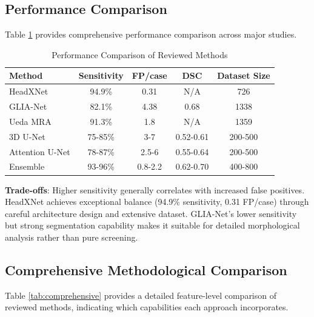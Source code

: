 \documentclass[conference]{IEEEtran}
\begin{document}
\subsection{Performance Comparison}

Table \ref{tab:performance} provides comprehensive performance comparison across major studies.

\begin{table}[htbp]
\caption{Performance Comparison of Reviewed Methods}
\begin{center}
\begin{tabular}{|l|c|c|c|c|}
\hline
\textbf{Method} & \textbf{Sensitivity} & \textbf{FP/case} & \textbf{DSC} & \textbf{Dataset Size} \\
\hline
HeadXNet & 94.9\% & 0.31 & N/A & 726 \\
\hline
GLIA-Net & 82.1\% & 4.38 & 0.68 & 1338 \\
\hline
Ueda MRA & 91.3\% & 1.8 & N/A & 1359 \\
\hline
3D U-Net & 75-85\% & 3-7 & 0.52-0.61 & 200-500 \\
\hline
Attention U-Net & 78-87\% & 2.5-6 & 0.55-0.64 & 200-500 \\
\hline
Ensemble & 93-96\% & 0.8-2.2 & 0.62-0.70 & 400-800 \\
\hline
\end{tabular}
\label{tab:performance}
\end{center}
\end{table}

\textbf{Trade-offs}: Higher sensitivity generally correlates with increased false positives. HeadXNet achieves exceptional balance (94.9\% sensitivity, 0.31 FP/case) through careful architecture design and extensive dataset. GLIA-Net's lower sensitivity but strong segmentation capability makes it suitable for detailed morphological analysis rather than pure screening.




\subsection{Comprehensive Methodological Comparison}

Table \ref{tab:comprehensive} provides a detailed feature-level comparison of reviewed methods, indicating which capabilities each approach incorporates.
\end{document}
